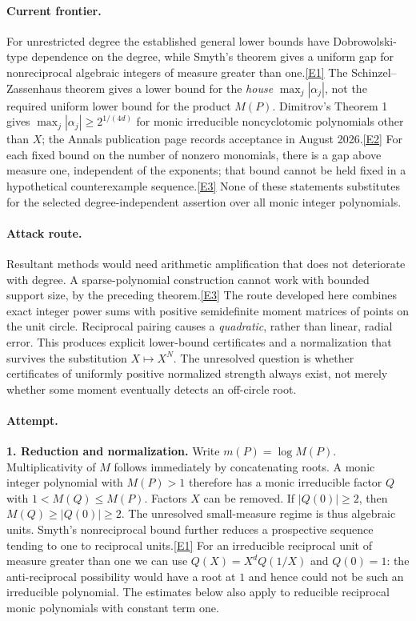 \documentclass[11pt,a4paper]{article}
\newcommand{\eref}[2]{\hyperlink{extra:#1:#2}{[E#2]}}
\begin{document}
\paragraph{Current frontier.}
For unrestricted degree the established general lower bounds have
Dobrowolski-type dependence on the degree, while Smyth's theorem gives
a uniform gap for nonreciprocal algebraic integers of measure greater than one.\eref{206}{1}
The Schinzel--Zassenhaus theorem gives a lower bound for the \emph{house}
$\max_j|\alpha_j|$, not the required uniform lower bound for the product
$M(P)$. Dimitrov's Theorem 1 gives $\max_j|\alpha_j|\ge2^{1/(4d)}$
for monic irreducible noncyclotomic polynomials other than $X$;
the Annals publication page records acceptance in August 2026.\eref{206}{2}
For each fixed bound on the number of nonzero monomials, there is a gap
above measure one, independent of the exponents; that bound cannot be
held fixed in a hypothetical counterexample sequence.\eref{206}{3}
None of these statements substitutes for the selected degree-independent
assertion over all monic integer polynomials.

\paragraph{Attack route.}
Resultant methods would need arithmetic amplification that does not
deteriorate with degree. A sparse-polynomial construction cannot work
with bounded support size, by the preceding theorem.\eref{206}{3}
The route developed here combines exact integer power sums with positive
semidefinite moment matrices of points on the unit circle. Reciprocal
pairing causes a \emph{quadratic}, rather than linear, radial error.
This produces explicit lower-bound certificates and a normalization
that survives the substitution $X\mapsto X^N$. The unresolved question
is whether certificates of uniformly positive normalized strength always
exist, not merely whether some moment eventually detects an off-circle
root.

\paragraph{Attempt.}
\textbf{1. Reduction and normalization.}
Write $m(P)=\log M(P)$. Multiplicativity of $M$ follows immediately by
concatenating roots. A monic integer polynomial with $M(P)>1$ therefore
has a monic irreducible factor $Q$ with $1<M(Q)\le M(P)$. Factors $X$
can be removed. If $|Q(0)|\ge2$, then
$M(Q)\ge|Q(0)|\ge2$. The unresolved small-measure regime is thus
algebraic units. Smyth's nonreciprocal bound further reduces a prospective
sequence tending to one to reciprocal units.\eref{206}{1}
For an irreducible reciprocal unit of measure greater than one we can
use $Q(X)=X^dQ(1/X)$ and $Q(0)=1$: the anti-reciprocal possibility
would have a root at $1$ and hence could not be such an irreducible
polynomial. The estimates below also apply to reducible reciprocal
monic polynomials with constant term one.
\end{document}
